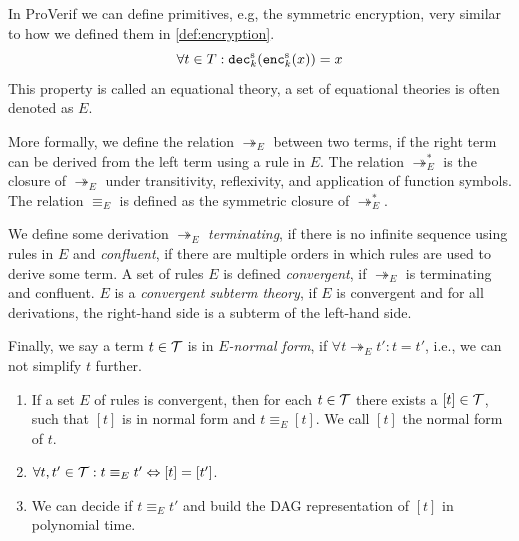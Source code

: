\begin{definition}
    In ProVerif we can define primitives, e.g, the symmetric encryption, very similar to how we defined them in \cref{def:encryption}.
    \[\forall t \in T: \texttt{dec}^\text{s}_k(\texttt{enc}^\text{s}_k(x)) = x\]
    This property is called an equational theory, a set of equational theories is often denoted as \(E\).

    More formally, we define the relation \(\twoheadrightarrow_E\) between two terms, if the right term can be derived from the left term using a rule in \(E\).
    The relation \(\twoheadrightarrow^*_E\) is the closure of \(\twoheadrightarrow_E\) under transitivity, reflexivity, and application of function symbols.
    The relation \(\equiv_E\) is defined as the symmetric closure of \(\twoheadrightarrow^*_E\).

    We define some derivation \(\twoheadrightarrow_E\) \emph{terminating}, if there is no infinite sequence using rules in \(E\) and \emph{confluent}, if there are multiple orders in which rules are used to derive some term.
    A set of rules \(E\) is defined \emph{convergent}, if \(\twoheadrightarrow_E\) is terminating and confluent.
    \(E\) is a \emph{convergent subterm theory}, if \(E\) is convergent and for all derivations, the right-hand side is a subterm of the left-hand side.

    Finally, we say a term \(t \in \mathcal{T}\) is in \(E\)\emph{-normal form}, if \(\forall t \twoheadrightarrow_E t': t = t'\), i.e., we can not simplify \(t\) further.
\end{definition}

\begin{theorem}\hfill
    \begin{enumerate}
        \item If a set \(E\) of rules is convergent, then for each \(t \in \mathcal{T}\) there exists a \([t] \in \mathcal{T}\), such that \([t]\) is in normal form and \(t \equiv_E [t]\).
            We call \([t]\) the normal form of \(t\).

        \item \(\forall t, t' \in \mathcal{T}: t \equiv_E t' \Leftrightarrow [t] = [t']\).

        \item We can decide if \(t \equiv_E t'\) and build the DAG representation of \([t]\) in polynomial time.
    \end{enumerate}
\end{theorem}

